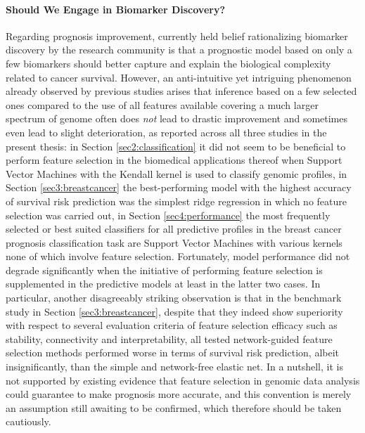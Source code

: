 \paragraph{Should We Engage in Biomarker Discovery?} Regarding prognosis improvement, currently held belief rationalizing biomarker discovery by the research community is that a prognostic model based on only a few biomarkers should better capture and explain the biological complexity related to cancer survival. However, an anti-intuitive yet intriguing phenomenon already observed by previous studies \cite{Haury2011influence} arises that inference based on a few selected ones compared to the use of all features available covering a much larger spectrum of genome often does \emph{not} lead to drastic improvement and sometimes even lead to slight deterioration, as reported across all three studies in the present thesis: in Section \ref{sec2:classification} it did not seem to be beneficial to perform feature selection in the biomedical applications thereof when Support Vector Machines with the Kendall kernel is used to classify genomic profiles, in Section \ref{sec3:breastcancer} the best-performing model with the highest accuracy of survival risk prediction was the simplest ridge regression in which no feature selection was carried out, in Section \ref{sec4:performance} the most frequently selected or best suited classifiers for all predictive profiles in the breast cancer prognosis classification task are Support Vector Machines with various kernels none of which involve feature selection. Fortunately, model performance did not degrade significantly when the initiative of performing feature selection is supplemented in the predictive models at least in the latter two cases. In particular, another disagreeably striking observation is that in the benchmark study in Section \ref{sec3:breastcancer}, despite that they indeed show superiority with respect to several evaluation criteria of feature selection efficacy such as stability, connectivity and interpretability, all tested network-guided feature selection methods performed worse in terms of survival risk prediction, albeit insignificantly, than the simple and network-free elastic net. In a nutshell, it is not supported by existing evidence that feature selection in genomic data analysis could guarantee to make prognosis more accurate, and this convention is merely an assumption still awaiting to be confirmed, which therefore should be taken cautiously.


